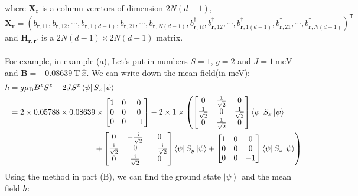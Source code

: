 \documentclass[letter]{article}
\newcommand{\ii}{\mathrm{i}}
\begin{document}
 where $\mathbf{X}_{\bm{r}}$ is a column verctors of dimension $2N(d-1)$, $$\mathbf{X}_{\bm{r}}=\left(b_{\bm{r},11},b_{\bm{r},12},\cdots,b_{\bm{r},1(d-1)},b_{\bm{r},21},\cdots,b_{\bm{r},N(d-1)},b_{\bm{r},1i}^{\dagger},b_{\bm{r},12}^{\dagger},\cdots,b_{\bm{r},1(d-1)}^{\dagger},b_{\bm{r},21}^{\dagger},\cdots,b_{\bm{r},N(d-1)}^{\dagger}\right)^{\mathsf{T}}$$
and $\mathbf{H}_{\bm{r},\bm{r}'}$ is a $2N(d-1)\times 2N(d-1)$ matrix.\\
---------------------------------\\
 For example, in example (a), Let's put in numbers $S=1$, $g=2$ and $J=\SI{1}{\milli\electronvolt}$
and $\bm{B}=-\SI{0.08639}{\tesla}\ \hat{x}.$ We can write down the mean field(in meV):
$$\begin{aligned}
    h&=  g\mu_{\mathrm{B}} B^z S^z-2J S^z \left<\psi\right|S_z\left|\psi\right>\\
    & = 2\times 0.05788\times 0.08639\times  \begin{bmatrix}
        1 & 0 & 0\\
       0 &  0 & 0\\
        0& 0 & -1
        \end{bmatrix}-2\times1\times\left( \begin{bmatrix}
            0 & \frac{1}{\sqrt{2}} & 0\\
            \frac{1}{\sqrt{2}} &  0 &\frac{1}{\sqrt{2}}\\
        0& \frac{1}{\sqrt{2}}& 0
            \end{bmatrix} \left<\psi\right|S_x\left|\psi\right>\right.\\
           & {\ \ \ \ \ \ \ \ \ \ \ \ \ \ }\indent \indent\indent\indent\left.+\begin{bmatrix}
                0& -\frac{\ii}{\sqrt{2}} & 0\\
                \frac{\ii}{\sqrt{2}} &  0 & -\frac{\ii}{\sqrt{2}}\\
            0& \frac{\ii}{\sqrt{2}}&0
                \end{bmatrix} \left<\psi\right|S_y\left|\psi\right>+\begin{bmatrix}
            1 & 0 & 0\\
        0 &  0 & 0\\
        0& 0&-1
            \end{bmatrix} \left<\psi\right|S_z\left|\psi\right>\right)
\end{aligned}$$
Using the method in part (B), we can find the ground state $\left|\psi\right>$ and the mean field $h$:
\end{document}
